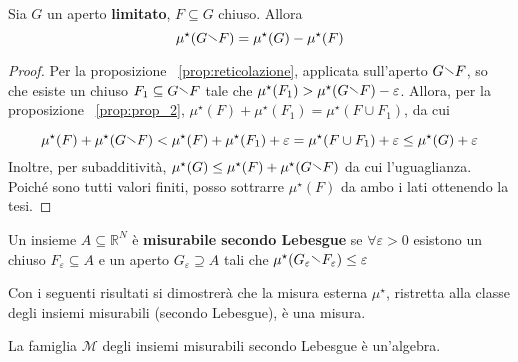 \begin{proposition}\label{prop:prop_4}
Sia \(G\) un aperto \textbf{limitato}, \(F \subseteq G \) chiuso. Allora 
\[\mu^\star(G \sminus F) = \mu^\star(G) - \mu^\star(F)\]
\end{proposition}
\begin{proof}

Per la proposizione
~\ref{prop:reticolazione}, 
applicata sull'aperto \(G \sminus F\), so che esiste un
chiuso \(F_{1} \subseteq G \sminus F \) tale che \(\mu^\star(F_{1}) >
\mu^\star(G \sminus F) - \varepsilon\). Allora, per la proposizione
~\ref{prop:prop_2},
\(\mu^\star(F) + \mu^\star(F_{1})
= \mu^\star(F \cup F_{1})\), da cui

\[
    \mu^\star(F) + \mu^\star(G\sminus F) < \mu^\star(F) + \mu^\star(F_{1}) +
    \varepsilon = \mu^\star(F \cup F_{1}) + \varepsilon \le \mu^\star(G) + \varepsilon
\]
Inoltre, per subadditività, \(\mu^\star(G) \le \mu^\star(F) + \mu^\star(G\sminus F)\) da cui
l'uguaglianza. Poiché sono tutti valori finiti, posso sottrarre \(\mu^\star(F)\)
da ambo i lati ottenendo la tesi.
\end{proof}
\begin{definition}
    Un insieme \(A \subseteq \mathbb{R}^{N} \) è \textbf{misurabile secondo
    Lebesgue} se \(\forall \varepsilon > 0\) esistono un chiuso \(F_\varepsilon
    \subseteq A \) e un aperto \(G_\varepsilon \supseteq A \) tali che
    \(\mu^\star(G_\varepsilon \sminus F_\varepsilon) \le \varepsilon\) 
\end{definition}
\begin{remark}
    Con i seguenti risultati si dimostrerà che la misura esterna \(\mu^\star\),
    ristretta alla classe degli insiemi misurabili (secondo Lebesgue), è una
    misura.
\end{remark}
\begin{theorem}
    La famiglia \(\mathcal{M}\) degli insiemi misurabili secondo Lebesgue è
    un'algebra.
\end{theorem}
